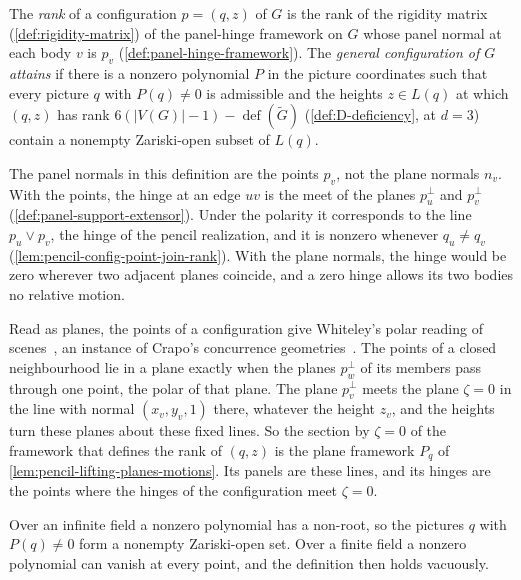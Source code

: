 \begin{definition}
  \label{def:pencil-x0-attains}
  \leanok
  The \emph{rank} of a configuration $p = (q, z)$ of $G$ is the rank of
  the rigidity matrix (\cref{def:rigidity-matrix}) of the panel-hinge
  framework on $G$ whose panel normal at each body $v$ is $p_v$
  (\cref{def:panel-hinge-framework}). The \emph{general configuration of
  $G$ attains} if there is a nonzero polynomial $P$ in the picture
  coordinates such that every picture $q$ with $P(q) \neq 0$ is
  admissible and the heights $z \in L(q)$ at which $(q, z)$ has rank
  $6(|V(G)| - 1) - \operatorname{def}(\tilde G)$ (\cref{def:D-deficiency},
  at $d = 3$) contain a nonempty Zariski-open subset of $L(q)$.
\end{definition}

The panel normals in this definition are the points $p_v$, not the plane
normals $n_v$. With the points, the hinge at an edge $uv$ is the meet of
the planes $p_u^{\perp}$ and $p_v^{\perp}$
(\cref{def:panel-support-extensor}). Under the polarity it corresponds
to the line $p_u \vee p_v$, the hinge of the pencil realization, and it
is nonzero whenever $q_u \neq q_v$
(\cref{lem:pencil-config-point-join-rank}). With the plane normals, the
hinge would be zero wherever two adjacent planes coincide, and a zero
hinge allows its two bodies no relative motion.

Read as planes, the points of a configuration give Whiteley's polar
reading of scenes~\cite[\S 5.1, p.~87]{whiteley1989}, an instance of
Crapo's concurrence geometries~\cite[\S 7]{crapo1984}. The points of a
closed neighbourhood lie in a plane exactly when the planes
$p_w^{\perp}$ of its members pass through one point, the polar of that
plane. The plane $p_v^{\perp}$ meets the plane $\zeta = 0$ in the line
with normal $(x_v, y_v, 1)$ there, whatever the height $z_v$, and the
heights turn these planes about these fixed lines. So the section by
$\zeta = 0$ of the framework that defines the rank of $(q, z)$ is the
plane framework $P_q$ of \cref{lem:pencil-lifting-planes-motions}. Its
panels are these lines, and its hinges are the points where the hinges
of the configuration meet $\zeta = 0$.

Over an infinite field a nonzero polynomial has a non-root, so the
pictures $q$ with $P(q) \neq 0$ form a nonempty Zariski-open set. Over a
finite field a nonzero polynomial can vanish at every point, and the
definition then holds vacuously.

